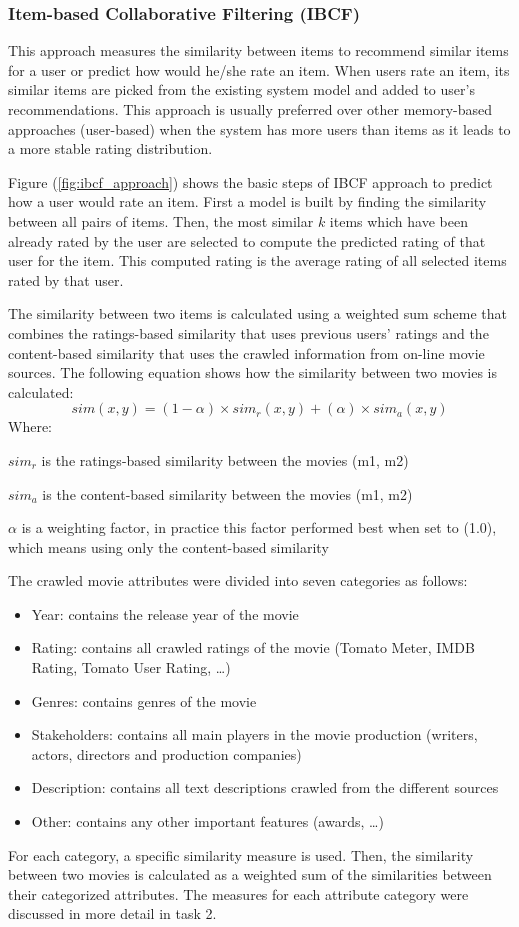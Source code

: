 \documentclass{sigish}
\begin{document}
\subsubsection{Item-based Collaborative Filtering (IBCF)}

This approach measures the similarity between items to recommend similar items for a user or predict how would he/she rate an item. When users rate an item, its similar items are picked from the existing system model and added to user's recommendations. This approach is usually preferred over other memory-based approaches (user-based) when the system has more users than items as it leads to a more stable rating distribution.

Figure (\ref{fig:ibcf_approach}) shows the basic steps of IBCF approach to predict how a user would rate an item. First a model is built by finding the similarity between all pairs of items. Then, the most similar $ k $ items which have been already rated by the user are selected to compute the predicted rating of that user for the item. This computed rating is the average rating of all selected items rated by that user.

The similarity between two items is calculated using a weighted sum scheme that combines the ratings-based similarity that uses previous users' ratings and the content-based similarity that uses the crawled information from on-line movie sources. The following equation shows how the similarity between two movies is calculated:
\begin{equation}
sim(x, y) = (1 - \alpha) \times sim_{r}(x, y) + (\alpha) \times sim_{a}(x, y)
\end{equation}
Where:

$ sim_{r} $ is the ratings-based similarity between the movies (m1, m2)

$ sim_{a} $ is the content-based similarity between the movies (m1, m2)

$ \alpha $  is a weighting factor, in practice this factor performed best when set to (1.0), which means using only the content-based similarity

The crawled movie attributes were divided into seven categories as follows:
\begin{itemize}
	\item Year: contains the release year of the movie
	\item Rating: contains all crawled ratings of the movie (Tomato Meter, IMDB Rating, Tomato User Rating, …)
	\item Genres: contains genres of the movie
	\item Stakeholders: contains all main players in the movie production (writers, actors, directors and production companies)
	\item Description: contains all text descriptions crawled from the different sources
	\item Other: contains any other important features (awards, …)
\end{itemize}
For each category, a specific similarity measure is used. Then, the similarity between two movies is calculated as a weighted sum of the similarities between their categorized attributes. The measures for each attribute category were discussed in more detail in task 2.
\end{document}
